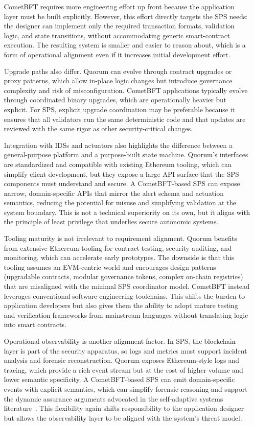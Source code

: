 CometBFT requires more engineering effort up front because the application layer must be built explicitly. However, this effort directly targets the SPS needs: the designer can implement only the required transaction formats, validation logic, and state transitions, without accommodating generic smart-contract execution. The resulting system is smaller and easier to reason about, which is a form of operational alignment even if it increases initial development effort.

Upgrade paths also differ. Quorum can evolve through contract upgrades or proxy patterns, which allow in-place logic changes but introduce governance complexity and risk of misconfiguration. CometBFT applications typically evolve through coordinated binary upgrades, which are operationally heavier but explicit. For SPS, explicit upgrade coordination may be preferable because it ensures that all validators run the same deterministic code and that updates are reviewed with the same rigor as other security-critical changes.

Integration with IDSs and actuators also highlights the difference between a general-purpose platform and a purpose-built state machine. Quorum's interfaces are standardized and compatible with existing Ethereum tooling, which can simplify client development, but they expose a large API surface that the SPS components must understand and secure. A CometBFT-based SPS can expose narrow, domain-specific APIs that mirror the alert schema and actuation semantics, reducing the potential for misuse and simplifying validation at the system boundary. This is not a technical superiority on its own, but it aligns with the principle of least privilege that underlies secure autonomic systems.

Tooling maturity is not irrelevant to requirement alignment. Quorum benefits from extensive Ethereum tooling for contract testing, security auditing, and monitoring, which can accelerate early prototypes. The downside is that this tooling assumes an EVM-centric world and encourages design patterns (upgradable contracts, modular governance tokens, complex on-chain registries) that are misaligned with the minimal SPS coordinator model. CometBFT instead leverages conventional software engineering toolchains. This shifts the burden to application developers but also gives them the ability to adopt mature testing and verification frameworks from mainstream languages without translating logic into smart contracts.

Operational observability is another alignment factor. In SPS, the blockchain layer is part of the security apparatus, so logs and metrics must support incident analysis and forensic reconstruction. Quorum exposes Ethereum-style logs and tracing, which provide a rich event stream but at the cost of higher volume and lower semantic specificity. A CometBFT-based SPS can emit domain-specific events with explicit semantics, which can simplify forensic reasoning and support the dynamic assurance arguments advocated in the self-adaptive systems literature~\cite{calinescu2017engineering}. This flexibility again shifts responsibility to the application designer but allows the observability layer to be aligned with the system's threat model.

